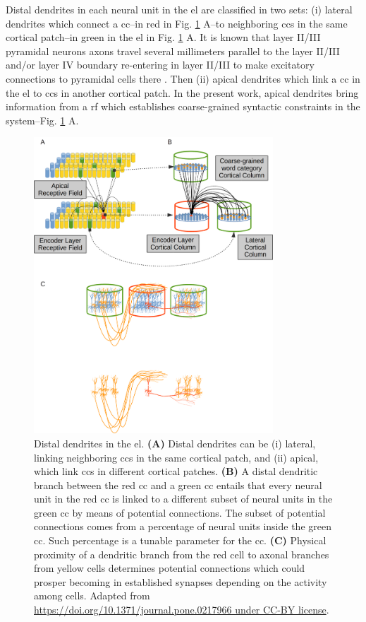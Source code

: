 {Distal dendrites in each neural unit in the \gls{el} are classified in two sets: (i) lateral dendrites which connect a \gls{cc}--in red in Fig. \ref{fig:DistalDendrites1} A--to neighboring \glspl{cc} in the same cortical patch--in green in the \gls{el} in Fig. \ref{fig:DistalDendrites1} A.
It is known that layer II/III pyramidal neurons axons travel several millimeters parallel to the layer II/III and/or layer IV boundary re-entering in layer II/III to make excitatory connections to pyramidal cells there \cite{BANNISTER200595,10.1093/cercor/13.1.15}.
Then (ii) apical dendrites which link a \gls{cc} in the \gls{el} to \glspl{cc} in another cortical patch. In the present work, apical dendrites bring information from a \gls{rf} which establishes coarse-grained syntactic constraints in the system--Fig. \ref{fig:DistalDendrites1} A.

\begin{figure}[ht!]
    \centering
    \includegraphics[width=0.8\textwidth]{DistalDendrites1.png}
    \caption{Distal dendrites in the \gls{el}.
    \textbf{(A)} Distal dendrites can be (i) lateral, linking neighboring \glspl{cc} in the same cortical patch, and (ii) apical, which link \glspl{cc} in different cortical patches.
    \textbf{(B)} A distal dendritic branch between the red \gls{cc} and a green \gls{cc} entails that every neural unit in the red \gls{cc} is linked to a different subset of neural units in the green \gls{cc} by means of potential connections. The subset of potential connections comes from a percentage of neural units inside the green \gls{cc}. Such percentage is a tunable parameter for the \gls{cc}.
    \textbf{(C)} Physical proximity of a dendritic branch from the red cell to axonal branches from yellow cells determines potential connections which could prosper becoming in established synapses depending on the activity among cells.
    Adapted from \url{https://doi.org/10.1371/journal.pone.0217966 under CC-BY license}.}
    \label{fig:DistalDendrites1}
\end{figure}

}
